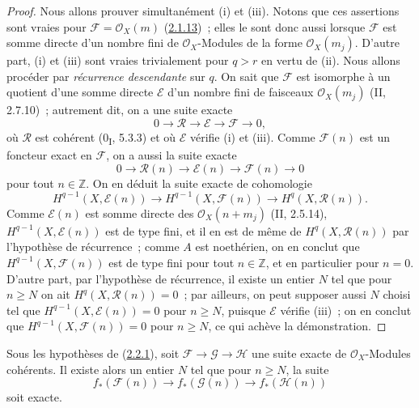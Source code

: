 \begin{proof}
Nous allons prouver simultanément (i) et (iii). Notons que ces assertions
sont vraies pour $\mathcal F=\mathcal O_X(m)$
(\hyperref[III.2.1.13-fr]{2.1.13})~; elles le sont donc aussi lorsque
$\mathcal F$ est somme directe d'un nombre fini de
$\mathcal O_X$-Modules de la forme $\mathcal O_X(m_j)$. D'autre part,
(i) et (iii) sont vraies trivialement pour $q>r$ en vertu de (ii). Nous
allons procéder par \emph{récurrence descendante} sur $q$. On sait que
$\mathcal F$ est isomorphe à un quotient d'une somme directe $\mathcal E$
d'un nombre fini de faisceaux $\mathcal O_X(m_j)$ (II, 2.7.10)~;
autrement dit, on a une suite exacte
\[
0\longrightarrow\mathcal R\longrightarrow\mathcal E
\longrightarrow\mathcal F\longrightarrow0,
\]
où $\mathcal R$ est cohérent (0\textsubscript{I}, 5.3.3) et où
$\mathcal E$ vérifie (i) et (iii). Comme $\mathcal F(n)$ est un foncteur
exact en $\mathcal F$, on a aussi la suite exacte
\[
0\longrightarrow\mathcal R(n)\longrightarrow\mathcal E(n)
\longrightarrow\mathcal F(n)\longrightarrow0
\]
pour tout $n\in\mathbb Z$. On en déduit la suite exacte de cohomologie
\[
H^{q-1}(X,\mathcal E(n))\longrightarrow
H^{q-1}(X,\mathcal F(n))\longrightarrow
H^q(X,\mathcal R(n)).
\]
Comme $\mathcal E(n)$ est somme directe des $\mathcal O_X(n+m_j)$
(II, 2.5.14), $H^{q-1}(X,\mathcal E(n))$ est de type fini, et il en est
de même de $H^q(X,\mathcal R(n))$ par l'hypothèse de récurrence~; comme
$A$ est noethérien, on en conclut que
$H^{q-1}(X,\mathcal F(n))$ est de type fini pour tout $n\in\mathbb Z$, et
en particulier pour $n=0$. D'autre part, par l'hypothèse de récurrence,
il existe un entier $N$ tel que pour $n\geq N$ on ait
$H^q(X,\mathcal R(n))=0$~; par ailleurs, on peut supposer aussi $N$ choisi
tel que $H^{q-1}(X,\mathcal E(n))=0$ pour $n\geq N$, puisque $\mathcal E$
vérifie (iii)~; on en conclut que
$H^{q-1}(X,\mathcal F(n))=0$ pour $n\geq N$, ce qui achève la
démonstration.
\end{proof}

\begin{corollary}[2.2.3]
\label{III.2.2.3-fr}
Sous les hypothèses de (\hyperref[III.2.2.1-fr]{2.2.1}), soit
$\mathcal F\to\mathcal G\to\mathcal H$ une suite exacte de
$\mathcal O_X$-Modules cohérents. Il existe alors un entier $N$ tel que
pour $n\geq N$, la suite
\[
f_*(\mathcal F(n))\longrightarrow f_*(\mathcal G(n))
\longrightarrow f_*(\mathcal H(n))
\]
soit exacte.
\end{corollary}

